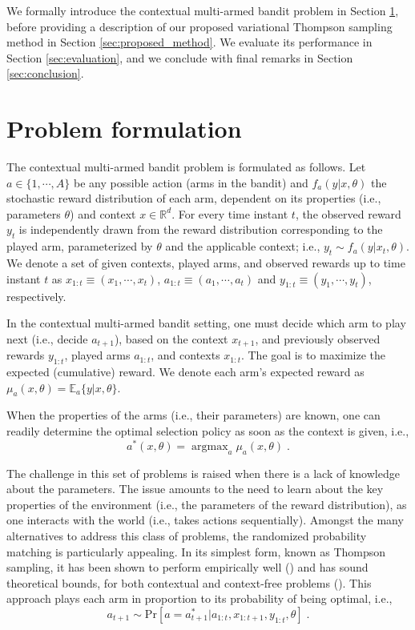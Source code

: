 \documentclass{article}
\def \Real{{\mathbb R}}
\newcommand{\ie}{i.e., }
\newcommand{\argmax}{\mathop{\mathrm{argmax}}}
\begin{document}
We formally introduce the contextual multi-armed bandit problem in Section \ref{sec:problem_formulation}, before providing a description of our proposed variational Thompson sampling method in Section \ref{sec:proposed_method}. We evaluate its performance in Section \ref{sec:evaluation}, and we conclude with final remarks in Section \ref{sec:conclusion}.

\section{Problem formulation}
\label{sec:problem_formulation}

The contextual multi-armed bandit problem is formulated as follows. Let $a\in\{1,\cdots,A\}$ be any possible action (arms in the bandit) and $f_{a}(y|x,\theta)$ the stochastic reward distribution of each arm, dependent on its properties (\ie parameters $\theta$) and context $x\in\Real^{d}$. For every time instant $t$, the observed reward $y_t$ is independently drawn from the reward distribution corresponding to the played arm, parameterized by $\theta$ and the applicable context; \ie $y_t\sim f_{a}(y|x_t,\theta)$. We denote a set of given contexts, played arms, and observed rewards up to time instant $t$ as $x_{1:t} \equiv (x_1, \cdots , x_t)$, $a_{1:t} \equiv (a_1, \cdots , a_t)$ and $y_{1:t} \equiv (y_1, \cdots , y_t)$, respectively.

In the contextual multi-armed bandit setting, one must decide which arm to play next (\ie decide $a_{t+1}$), based on the context $x_{t+1}$, and previously observed rewards $y_{1:t}$, played arms $a_{1:t}$, and contexts $x_{1:t}$. The goal is to maximize the expected (cumulative) reward. We denote each arm's expected reward as $\mu_{a}(x,\theta)=\mathbb{E}_{a}\{y|x,\theta\}$. 

When the properties of the arms (\ie their parameters) are known, one can readily determine the optimal selection policy as soon as the context is given, \ie
		\begin{equation}
		a^*(x,\theta)=\argmax_{a}\mu_{a}(x,\theta) \; .
		\end{equation}
		
The challenge in this set of problems is raised when there is a lack of knowledge about the parameters. The issue amounts to the need to learn about the key properties of the environment (\ie the parameters of the reward distribution), as one interacts with the world (\ie takes actions sequentially). Amongst the many alternatives to address this class of problems, the randomized probability matching is particularly appealing. In its simplest form, known as Thompson sampling, it has been shown to perform empirically well (\cite{ic-Chapelle2011, j-Scott2015}) and has sound theoretical bounds, for both contextual and context-free problems (\cite{j-Agrawal2012,j-Agrawal2012a}). This approach plays each arm in proportion to its probability of being optimal, \ie
\begin{equation}
a_{t+1} \sim \mathrm{Pr}\left[a=a_{t+1}^*|a_{1:t}, x_{1:t+1}, y_{1:t}, \theta \right] \;.
\end{equation} 
\end{document}
